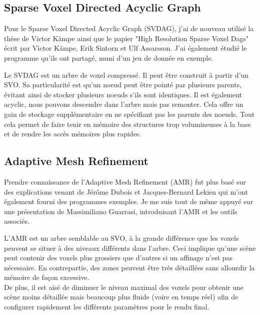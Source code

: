 \documentclass[12pt,a4paper,twoside]{article}
\begin{document}
    \subsection{Sparse Voxel Directed Acyclic Graph}

    Pour le Sparse Voxel Directed Acyclic Graph (SVDAG), j'ai de nouveau utilisé la thèse de Victor Kämpe ainsi que le papier
    "High Resolution Sparse Voxel Dags" écrit par Victor Kämpe, Erik Sintorn et Ulf Assarsson. J'ai également étudié le
    programme qu'ils ont partagé, muni d'un jeu de donnée en exemple.

    Le SVDAG est un arbre de voxel compressé. Il peut être construit à partir d'un SVO.
    Sa particularité est qu'un noeud peut être pointé par plusieurs parents, évitant ainsi de stocker plusieurs noeuds s'ils sont identiques.
    Il est également acyclic, nous pouvons descendre dans l'arbre mais pas remonter. Cela offre un gain de stockage supplémentaire en ne spécifiant pas les parents des noeuds.
    Tout cela permet de faire tenir en mémoire des structures trop volumineuses à la base et de rendre les accès mémoires plus rapides.

    \begin{figure}[H]
    \end{figure}

    \begin{figure}[H]
    \end{figure}
    \newpage
    \subsection{Adaptive Mesh Refinement}

    Prendre connaissance de l'Adaptive Mesh Refinement (AMR) fut plus basé sur des explications venant de
    Jérôme Dubois et Jacques-Bernard Lekien qui m'ont également fourni des programmes exemples. Je me suis tout de même
    appuyé sur une présentation de Massimiliano Guarrasi, introduisant l'AMR et les outils associés.

    L'AMR est un arbre semblable au SVO, à la grande différence que les voxels peuvent se situer à des niveaux différents dans l'arbre.
    Ceci implique qu'une scène peut contenir des voxels plus grossiers que d'autres si un affinage n'est pas nécessaire.
    En contrepartie, des zones peuvent être très détaillées sans allourdir la mémoire de façon excessive. \\
    De plus, il est aisé de diminuer le niveau maximal des voxels pour obtenir une scène moins détaillée
    mais beaucoup plus fluide (voire en temps réel) afin de configurer rapidement les différents paramètres pour le rendu final.
\end{document}
